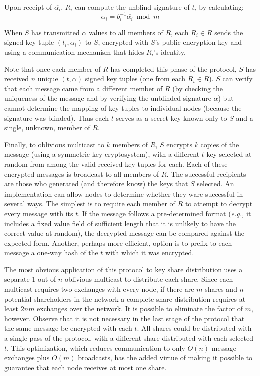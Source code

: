 Upon receipt of $\overline{\alpha_i}$, $R_i$ can compute the unblind
signature of $t_i$ by calculating:
\[\alpha_i = b_i^{-1}\overline{\alpha_i} \bmod m\]

When $S$ has transmitted $\overline{\alpha}$ values to all members of
$R$, each $R_i \in R$ sends the signed key tuple $(t_i, \alpha_i)$ to
$S$, encrypted with $S$'s public encryption key and using a
communication mechanism that hides $R_i$'s identity.

Note that once each member of $R$ has completed this phase of the
protocol, $S$ has received $n$ unique $(t, \alpha)$ signed key tuples
(one from each $R_i \in R$).  $S$ can verify that each message came
from a different member of $R$ (by checking the uniqueness of the
message and by verifying the unblinded signature $\alpha$) but cannot
determine the mapping of key tuples to individual nodes (because the
signature was blinded).  Thus each $t$ serves as a secret key known
only to $S$ and a single, unknown, member of $R$.

Finally, to oblivious multicast to $k$ members of $R$, $S$ encrypts
$k$ copies of the message (using a symmetric-key cryptosystem), with a
different $t$ key selected at random from among the valid received key
tuples for each.  Each of these encrypted messages is broadcast to all
members of $R$.  The successful recipients are those who generated
(and therefore know) the keys that $S$ selected.  An implementation
can allow nodes to determine whether they ware successful in several
ways.  The simplest is to require each member of $R$ to attempt to
decrypt every message with its $t$.  If the message follows a
pre-determined format ({\em e.g.,} it includes a fixed value field of
sufficient length that it is unlikely to have the correct value at
random), the decrypted message can be compared against the expected
form.  Another, perhaps more efficient, option is to prefix to each
message a one-way hash of the $t$ with which it was encrypted.

The most obvious application of this protocol to key share
distribution uses a separate 1-out-of-$n$ oblivious multicast to
distribute each share.  Since each multicast requires two exchanges
with every node, if there are $m$ shares and $n$ potential
shareholders in the network a complete share distribution requires at
least $2nm$ exchanges over the network.  It is possible to eliminate
the factor of $m$, however.  Observe that it is not necessary in the
last stage of the protocol that the same message be encrypted with
each $t$.  All shares could be distributed with a single pass of the
protocol, with a different share distributed with each selected $t$.
This optimization, which reduces communication to only $O(n)$ message
exchanges plus $O(m)$ broadcasts, has the added virtue of making it
possible to guarantee that each node receives at most one share.

